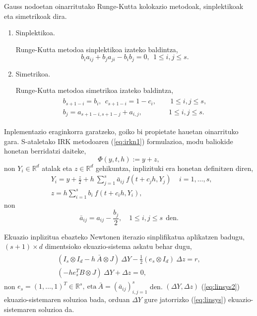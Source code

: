 Gauss nodoetan oinarritutako Runge-Kutta kolokazio metodoak, sinplektikoak eta simetrikoak \cite{Sanz-Serna1992} dira. 
\begin{enumerate}
\item Sinplektikoa.

Runge-Kutta metodoa sinplektikoa izateko baldintza,
\begin{equation} 
\label{eq:sympl}
b_{i}a_{ij}+b_{j}a_{ji}-b_{i}b_{j}=0, \ \ 1 \leqslant i,j \leqslant s.
\end{equation} 
\item Simetrikoa.

Runge-Kutta metodoa simetrikoa izateko baldintza,
\begin{align}
\label{eq:simm}
\begin{split}
b_{s+1-i}=b_i, \ \ {c}_{s+1-i}=1-{c}_i,& \quad \ 1\leqslant i,j \leqslant s, \\
b_j={a}_{s+1-i,s+1-j}+a_{i,j},& \quad 1\leqslant i,j \leqslant s. 
\end{split}
\end{align} 
\end{enumerate}

Inplementazio eraginkorra garatzeko, goiko bi propietate hauetan oinarrituko gara.
S-ataletako IRK metodoaren (\ref{eq:irkn1}) formulazioa, modu baliokide honetan berridatzi daiteke,
\begin{equation}
\Phi(y,t,h):=y+z,
\end{equation}
non $Y_i \in \mathbb{R}^d$ atalak eta $z \in \mathbb{R}^d$ gehikuntza, inplizituki era honetan definitzen diren,
\begin{align}
&Y_{i}=y+\frac{z}{2}+ h\ \sum^s_{j=1}{\bar{a}_{ij}\ f(t+c_jh,Y_{j})}\ \ \ \ \ i=1 ,\dots, s,\\
&z=h \sum_{i=1}^{s} {b_i \ f(t+c_ih,Y_{i})},
\end{align} 
non
\begin{equation}
\bar{a}_{ij}=a_{ij}-\frac{b_j}{2}, \quad 1\leqslant i,j \leqslant s \ \ \text{den}.
\end{equation} 

Ekuazio inplizitua ebazteko Newtonen iterazio sinplifikatua aplikatzen badugu, $(s+1) \times d$ dimentsioko ekuazio-sistema askatu behar dugu,
\begin{align}
\label{eq:linsys2}
\begin{split}
(I_s \otimes I_d- h \ \bar{A} \otimes J) \ \Delta Y - \frac{1}{2}(e_s \otimes I_d) \ \Delta z =r,\\
(-h e_s^T B \otimes J) \ \Delta Y+  \Delta z=0,
\end{split}
\end{align}
non $e_s=(1,\dots,1)^T \in \mathbb{R}^{s}, \ \text{eta} \ \bar{A}=(\bar{a}_{ij})_{i,j=1}^s$ den. $(\Delta Y, \Delta z)$ (\ref{eq:linsys2}) ekuazio-sistemaren soluzioa bada, orduan $\Delta Y$ gure jatorrizko (\ref{eq:linsys}) ekuazio-sistemaren soluzioa da.

